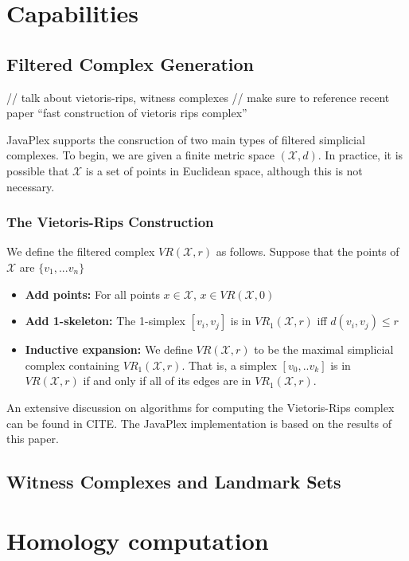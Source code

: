 \documentclass[10pt]{article}
\begin{document}
\section{Capabilities}

\subsection{Filtered Complex Generation}

// talk about vietoris-rips, witness complexes
// make sure to reference recent paper ``fast construction of vietoris rips complex''

JavaPlex supports the consruction of two main types of filtered simplicial complexes. To begin, we are given a finite metric space $(\mathcal{X}, d)$. In practice, it is possible that $\mathcal{X}$ is a set of points in Euclidean space, although this is not necessary.

\subsubsection{The Vietoris-Rips Construction}
We define the filtered complex $VR(\mathcal{X}, r)$ as follows. Suppose that the points of $\mathcal{X}$ are $\{v_1, ... v_n\}$

\begin{itemize}
\item {\bf Add points:} For all points $x \in \mathcal{X}$, $x \in VR(\mathcal{X}, 0)$
\item {\bf Add 1-skeleton:} The 1-simplex $[v_i, v_j]$ is in $VR_1(\mathcal{X}, r)$ iff $d(v_i, v_j) \leq r$
\item {\bf Inductive expansion:} We define $VR(\mathcal{X}, r)$ to be the maximal simplicial complex containing $VR_1(\mathcal{X}, r)$. That is, a simplex $[v_0, .. v_k]$ is in $VR(\mathcal{X}, r)$ if and only if all of its edges are in $VR_1(\mathcal{X}, r)$.
\end{itemize}

An extensive discussion on algorithms for computing the Vietoris-Rips complex can be found in CITE. The JavaPlex implementation is based on the results of this paper.

\subsection{Witness Complexes and Landmark Sets}

\section{Homology computation}
\end{document}
